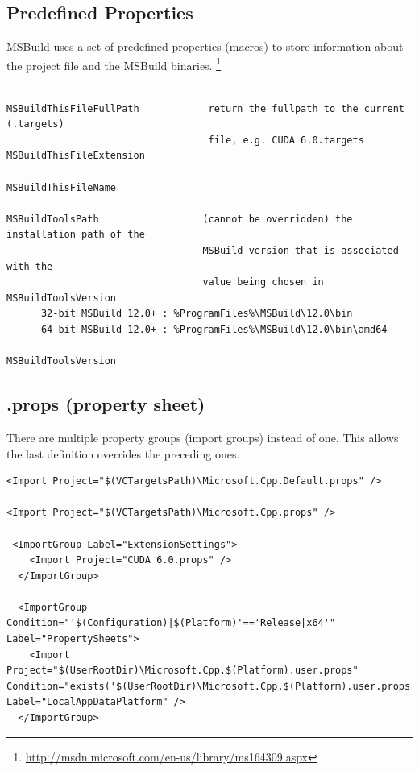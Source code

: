 \subsection{Predefined Properties}

MSBuild uses a set of predefined properties (macros) to store information about
the project file and the MSBuild binaries.
\footnote{\url{http://msdn.microsoft.com/en-us/library/ms164309.aspx}}
\begin{verbatim}

MSBuildThisFileFullPath            return the fullpath to the current (.targets)
                                   file, e.g. CUDA 6.0.targets
MSBuildThisFileExtension

MSBuildThisFileName

MSBuildToolsPath				  (cannot be overridden) the installation path of the
                                  MSBuild version that is associated with the
                                  value being chosen in MSBuildToolsVersion
      32-bit MSBuild 12.0+ : %ProgramFiles%\MSBuild\12.0\bin
      64-bit MSBuild 12.0+ : %ProgramFiles%\MSBuild\12.0\bin\amd64 
                                  
MSBuildToolsVersion                                                 
\end{verbatim}

\subsection{.props (property sheet)}

There are multiple property groups (import groups) instead of one. This allows
the last definition overrides the preceding ones.

\begin{verbatim}
<Import Project="$(VCTargetsPath)\Microsoft.Cpp.Default.props" />

<Import Project="$(VCTargetsPath)\Microsoft.Cpp.props" />

 <ImportGroup Label="ExtensionSettings">
    <Import Project="CUDA 6.0.props" />
  </ImportGroup>
  
  <ImportGroup Condition="'$(Configuration)|$(Platform)'=='Release|x64'" Label="PropertySheets">
    <Import Project="$(UserRootDir)\Microsoft.Cpp.$(Platform).user.props" Condition="exists('$(UserRootDir)\Microsoft.Cpp.$(Platform).user.props')" Label="LocalAppDataPlatform" />
  </ImportGroup>  
\end{verbatim}

